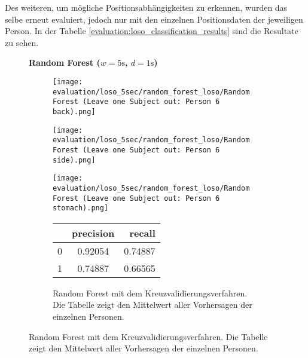 Des weiteren, um mögliche Positionsabhängigkeiten zu erkennen, wurden das selbe erneut evaluiert, jedoch nur mit den einzelnen Positionsdaten der jeweiligen Person. 
In der Tabelle \ref{evaluation:loso_classification_results} sind die Resultate zu sehen.


\begin{figure}[H]
  \textbf{Random Forest ($w=5\si{\s}$, $d=1\si{\s}$)}
    \centering
    \begin{subfigure}{1\textwidth}
        \texttt{[image: evaluation/loso\_5sec/random\_forest\_loso/Random Forest (Leave one Subject out: Person 6 back).png]}
      \end{subfigure}
      \begin{subfigure}{1\textwidth}
        \texttt{[image: evaluation/loso\_5sec/random\_forest\_loso/Random Forest (Leave one Subject out: Person 6 side).png]}
      \end{subfigure}
      \begin{subfigure}{1\textwidth}
        \texttt{[image: evaluation/loso\_5sec/random\_forest\_loso/Random Forest (Leave one Subject out: Person 6 stomach).png]}
    \end{subfigure}
    \begin{subfigure}{1\textwidth}
        \begin{center}
            \begin{tabular}{ | l | c | r | }
              \hline
               & precision & recall \\ \hline
              0 & 0.92054 & 0.74887 \\ \hline
              1 & 0.74887 & 0.66565 \\
              \hline
            \end{tabular}
        \end{center}
        \caption{Random Forest mit dem Kreuzvalidierungsverfahren. Die Tabelle zeigt den Mittelwert aller Vorhersagen der einzelnen Personen.}
        \label{implementation:app:screenshots:user_studies_information}
    \end{subfigure}
    \newline
    \vspace*{1 cm}

\end{figure}
